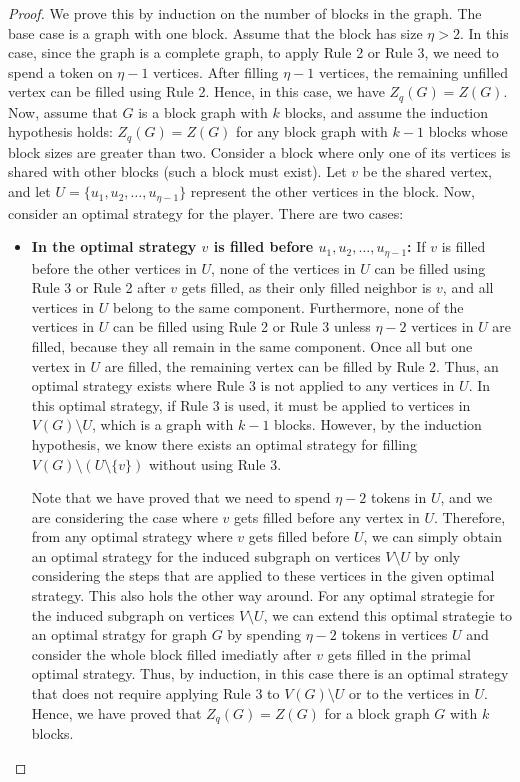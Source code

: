 \documentclass[11pt]{article}
\theoremstyle{plain}
\theoremstyle{definition}
\theoremstyle{remark}
\begin{document}
\begin{proof}
    We prove this by induction on the number of blocks in the graph. The base case is a graph with one block. Assume that the block has size $\eta > 2$. In this case, since the graph is a complete graph, to apply Rule 2 or Rule 3, we need to spend a token on $\eta-1$ vertices. After filling $\eta-1$ vertices, the remaining unfilled vertex can be filled using Rule 2. Hence, in this case, we have $Z_q(G) = Z(G)$. Now, assume that $G$ is a block graph with $k$ blocks, and assume the induction hypothesis holds: $Z_q(G) = Z(G)$ for any block graph with $k-1$ blocks whose block sizes are greater than two. Consider a block where only one of its vertices is shared with other blocks (such a block must exist). Let $v$ be the shared vertex, and let $U = \{u_1, u_2, \dots, u_{\eta-1} \}$ represent the other vertices in the block. Now, consider an optimal strategy for the player. There are two cases:

\begin{itemize}
    \item \textbf{In the optimal strategy $v$ is filled before $u_1, u_2, \dots, u_{\eta-1}$:} 
    If $v$ is filled before the other vertices in $U$, none of the vertices in $U$ can be filled using Rule 3 or Rule 2 after $v$ gets filled, as their only filled neighbor is $v$, and all vertices in $U$ belong to the same component. Furthermore, none of the vertices in $U$ can be filled using Rule 2 or Rule 3 unless $\eta-2$ vertices in $U$ are filled, because they all remain in the same component. Once all but one vertex in $U$ are filled, the remaining vertex can be filled by Rule 2. Thus, an optimal strategy exists where Rule 3 is not applied to any vertices in $U$. In this optimal strategy, if Rule 3 is used, it must be applied to vertices in $V(G) \setminus U$, which is a graph with $k-1$ blocks. However, by the induction hypothesis, we know there exists an optimal strategy for filling $V(G) \setminus (U \setminus \{v\})$ without using Rule 3. 
    
    Note that we have proved that we need to spend $\eta - 2$ tokens in $U$, and we are considering the case where $v$ gets filled before any vertex in $U$. Therefore, from any optimal strategy where $v$ gets filled before $U$, we can simply obtain an optimal strategy for the induced subgraph on vertices $V \setminus U$ by only considering the steps that are applied to these vertices in the given optimal strategy. This also hols the other way around. For any optimal strategie for the induced subgraph on vertices $V \setminus U$, we can extend this optimal strategie to an optimal stratgy for graph $G$ by spending $\eta - 2$ tokens in vertices $U$ and consider the whole block filled imediatly after $v$ gets filled in the primal optimal strategy. Thus, by induction, in this case there is an optimal strategy that does not require applying Rule 3 to $V(G) \setminus U$ or to the vertices in $U$. Hence, we have proved that $Z_q(G) = Z(G)$ for a block graph $G$ with $k$ blocks.
    

\end{itemize}
\end{proof}
\end{document}
